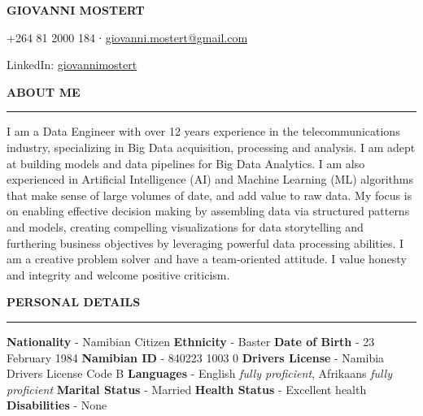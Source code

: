 \documentclass[
  letterpaper,
  DIV=11,
  numbers=noendperiod]{scrartcl}
\author{}
\date{}
\begin{document}
\begin{huge}\begin{center}{\bf GIOVANNI MOSTERT}\end{center}\end{huge}

\begin{center}+264 81 2000 184 ∙ \href{mailto:giovanni.mostert@gmail.com}{giovanni.mostert@gmail.com}
\end{center}
\begin{center}
  LinkedIn: \href{https://www.linkedin.com/in/giovannimostert}{giovannimostert}
\end{center}
\vspace{15pt}

\begin{large}{\bf ABOUT ME}
  \vspace{3pt}
  \hrule
\end{large}

I am a Data Engineer with over 12 years experience in the
telecommunications industry, specializing in Big Data acquisition,
processing and analysis. I am adept at building models and data
pipelines for Big Data Analytics. I am also experienced in Artificial
Intelligence (AI) and Machine Learning (ML) algorithms that make sense
of large volumes of date, and add value to raw data. My focus is on
enabling effective decision making by assembling data via structured
patterns and models, creating compelling visualizations for data
storytelling and furthering business objectives by leveraging powerful
data processing abilities. I am a creative problem solver and have a
team‑oriented attitude. I value honesty and integrity and welcome
positive criticism.

\vspace{5pt}

\begin{large}{\bf PERSONAL DETAILS}
  \vspace{3pt}
  \hrule
\end{large}

\textbf{Nationality} - Namibian Citizen \newline \textbf{Ethnicity} -
Baster \newline \textbf{Date of Birth} - 23 February 1984 \newline
\textbf{Namibian ID} - 840223 1003 0 \newline \textbf{Drivers License} -
Namibia Drivers License Code B \newline \textbf{Languages} - English
\emph{fully proficient}, Afrikaans \emph{fully proficient} \newline
\textbf{Marital Status} - Married \newline \textbf{Health Status} -
Excellent health \newline \textbf{Disabilities} - None
\end{document}

